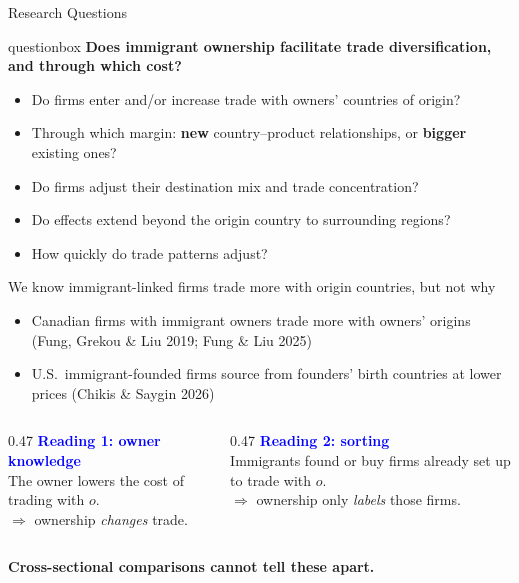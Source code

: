 \documentclass[notes,11pt, aspectratio=169]{beamer}
\begin{document}
\begin{frame}{Research Questions}
\vspace{0.2cm}

\begin{beamercolorbox}[
    wd=\textwidth,
    sep=10pt,
    center,
    rounded=true,
    shadow=true
]{questionbox}
\textbf{Does immigrant ownership facilitate trade diversification, and through which cost?}
\end{beamercolorbox}

\vspace{0.2cm}

\begin{itemize}\setlength{\itemsep}{6pt}
    \item Do firms enter and/or increase trade with owners' countries of origin?
    \item Through which margin: \textbf{new} country--product relationships, or \textbf{bigger} existing ones?
    \item Do firms adjust their destination mix and trade concentration?
    \item Do effects extend beyond the origin country to surrounding regions?
    \item How quickly do trade patterns adjust?
\end{itemize}

\end{frame}


\begin{frame}{We know immigrant-linked firms trade more with origin countries, but not why}
\begin{itemize}
\item Canadian firms with immigrant owners trade more with owners' origins (Fung, Grekou \& Liu 2019; Fung \& Liu 2025)
\item U.S.\ immigrant-founded firms source from founders' birth countries at lower prices (Chikis \& Saygin 2026)
\end{itemize}
\pause
\vspace{0.1cm}
\begin{columns}[T]
\begin{column}{0.47\textwidth}
\textcolor{blue}{\textbf{Reading 1: owner knowledge}}\\
The owner lowers the cost of trading with $o$.\\
$\Rightarrow$ ownership \emph{changes} trade.
\end{column}
\begin{column}{0.47\textwidth}
\textcolor{blue}{\textbf{Reading 2: sorting}}\\
Immigrants found or buy firms already set up to trade with $o$.\\
$\Rightarrow$ ownership only \emph{labels} those firms.
\end{column}
\end{columns}
\pause
\vspace{0.3cm}
\centering\textbf{Cross-sectional comparisons cannot tell these apart.}
\end{frame}
\end{document}
